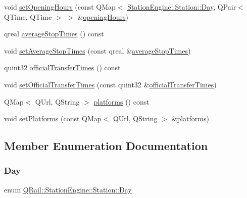 \begin{DoxyCompactItemize}
\item 
void \mbox{\hyperlink{classQRail_1_1StationEngine_1_1Station_a77c5ed806a41ad53afa4c03f96525bad}{set\+Opening\+Hours}} (const Q\+Map$<$ \mbox{\hyperlink{classQRail_1_1StationEngine_1_1Station_ae8c109a1d5ce2bb41959e62e32392631}{Station\+Engine\+::\+Station\+::\+Day}}, Q\+Pair$<$ Q\+Time, Q\+Time $>$ $>$ \&\mbox{\hyperlink{classQRail_1_1StationEngine_1_1Station_a952190a3454e31982d35cc3afd7d7d34}{opening\+Hours}})
\item 
qreal \mbox{\hyperlink{classQRail_1_1StationEngine_1_1Station_a4747748868a77baad4dd01daac657fcf}{average\+Stop\+Times}} () const
\item 
void \mbox{\hyperlink{classQRail_1_1StationEngine_1_1Station_a18cdb01a71d2b17cbfdcc2a67a028a8a}{set\+Average\+Stop\+Times}} (const qreal \&\mbox{\hyperlink{classQRail_1_1StationEngine_1_1Station_a4747748868a77baad4dd01daac657fcf}{average\+Stop\+Times}})
\item 
quint32 \mbox{\hyperlink{classQRail_1_1StationEngine_1_1Station_ad58620e2c5bf189e819165464d456d61}{official\+Transfer\+Times}} () const
\item 
void \mbox{\hyperlink{classQRail_1_1StationEngine_1_1Station_a1182f0a0ab0c0d3a168bb72389d108cb}{set\+Official\+Transfer\+Times}} (const quint32 \&\mbox{\hyperlink{classQRail_1_1StationEngine_1_1Station_ad58620e2c5bf189e819165464d456d61}{official\+Transfer\+Times}})
\item 
Q\+Map$<$ Q\+Url, Q\+String $>$ \mbox{\hyperlink{classQRail_1_1StationEngine_1_1Station_abc2d6647137da855d877a7061a261bc8}{platforms}} () const
\item 
void \mbox{\hyperlink{classQRail_1_1StationEngine_1_1Station_ab275347465eb810b7c8f2a6e1802feb4}{set\+Platforms}} (const Q\+Map$<$ Q\+Url, Q\+String $>$ \&\mbox{\hyperlink{classQRail_1_1StationEngine_1_1Station_abc2d6647137da855d877a7061a261bc8}{platforms}})
\end{DoxyCompactItemize}


\subsection{Member Enumeration Documentation}
\mbox{\label{classQRail_1_1StationEngine_1_1Station_ae8c109a1d5ce2bb41959e62e32392631}} 
\subsubsection{\texorpdfstring{Day}{Day}}
{\footnotesize\ttfamily enum \mbox{\hyperlink{classQRail_1_1StationEngine_1_1Station_ae8c109a1d5ce2bb41959e62e32392631}{Q\+Rail\+::\+Station\+Engine\+::\+Station\+::\+Day}}\hspace{0.3cm}{\ttfamily [strong]}}

